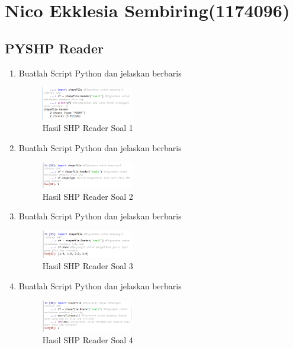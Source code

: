 \section{Nico Ekklesia Sembiring(1174096)}
\subsection{PYSHP Reader}
\begin{enumerate}
    \item Buatlah Script Python dan jelaskan berbaris
    
    \hfill\break
    \begin{figure}[H]
		\includegraphics[width=4cm]{figures/1174096/3/soal1.png}
		\centering
		\caption{Hasil SHP Reader Soal 1}
    \end{figure}
    
    \item Buatlah Script Python dan jelaskan berbaris
    
    \hfill\break
    \begin{figure}[H]
		\includegraphics[width=4cm]{figures/1174096/3/soal2.png}
		\centering
		\caption{Hasil SHP Reader Soal 2}
    \end{figure}
    
    \item Buatlah Script Python dan jelaskan berbaris
    
    \hfill\break
    \begin{figure}[H]
		\includegraphics[width=4cm]{figures/1174096/3/soal3.png}
		\centering
		\caption{Hasil SHP Reader Soal 3}
    \end{figure}
    
    \item Buatlah Script Python dan jelaskan berbaris
    
    \hfill\break
    \begin{figure}[H]
		\includegraphics[width=4cm]{figures/1174096/3/soal4.png}
		\centering
		\caption{Hasil SHP Reader Soal 4}
    \end{figure}
    

\end{enumerate}
